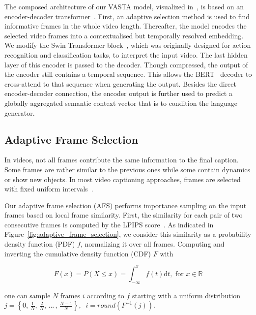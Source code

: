 \documentclass[runningheads,table]{llncs}
\newcommand{\modelName}{VASTA\xspace}
\begin{document}
The composed architecture of our \modelName model, visualized in~, is based on an encoder-decoder transformer~\cite{vaswani2017attention}.
First, an adaptive selection method is used to find informative frames in the whole video length. Thereafter, the model encodes the selected video frames into a contextualised but temporally resolved embedding.
We modify the Swin Transformer block~\cite{liu2021video}, which was originally designed for action recognition and classification tasks, to interpret the input video. 
The last hidden layer of this encoder is passed to the decoder. Though compressed, the output of the encoder still contains a temporal sequence. This allows the BERT~\cite{devlin2018bert} decoder to cross-attend to that sequence when generating the output. 
Besides the direct encoder-decoder connection, the encoder output is further used to predict a globally aggregated semantic context vector that is to condition the language generator. 

\subsection{Adaptive Frame Selection}\label{sec:adaptive_frame_selection}
In videos, not all frames contribute the same information to the final caption. Some frames are rather similar to the previous ones while some contain dynamics or show new objects. In most video captioning approaches, frames are selected with fixed uniform intervals~\cite{cherian2020spatio,tran2015learning,zhang2020object}. 


Our adaptive frame selection (AFS) performs importance sampling on the input frames based on local frame similarity. First, the similarity for each pair of two consecutive frames is computed by the LPIPS score~\cite{zhang2018perceptual}.
As indicated in Figure~\ref{fig:adaptive_frame_selection}, we consider this similarity as a probability density function (PDF) $f$, normalizing it over all frames. Computing and inverting the cumulative density function (CDF) $F$ with 

\begin{equation}
F(x)=P(X\leq x)= \int_{-\infty}^{x} f(t) \mathrm{d}t,\text{ for }x \in \mathbb{R}
\end{equation}

\noindent one can sample $N$ frames $i$ according to $f$ starting with a uniform distribution $
j= \left\{ 0, \, \frac{1}{N},\,\frac{2}{N}, \, ... \,,\,\frac{N-1}{N} \right\}\label{eq:indexframe},  \;\; i = round( F^{-1}(j) )$.
\end{document}
